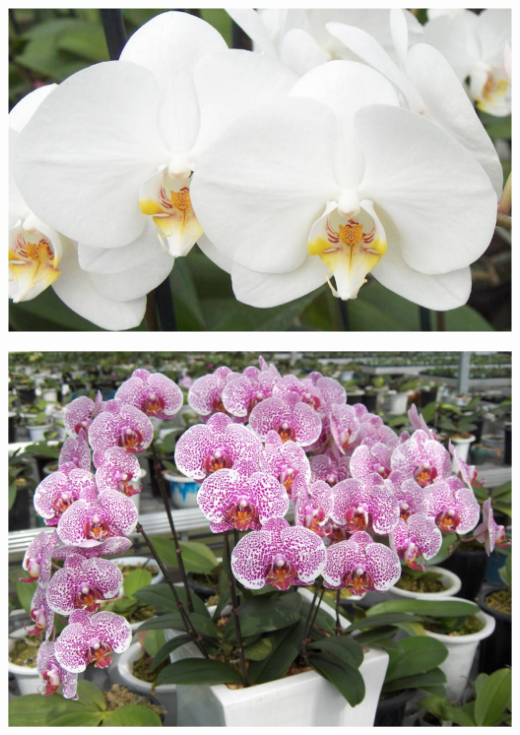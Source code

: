 \documentclass{article}
\begin{document}
\begin{center}
\includegraphics[width=0.9\textheight, angle=90]{../Orchid_Phalaenopsis_(MothOrchid)2.jpg}
\end{center}
\newpage

\begin{center}
\includegraphics[width=0.9\textheight, angle=90]{../Orchid_Phalaenopsis_(MothOrchid)_Plant.jpg}
\end{center}
\newpage
\end{document}
